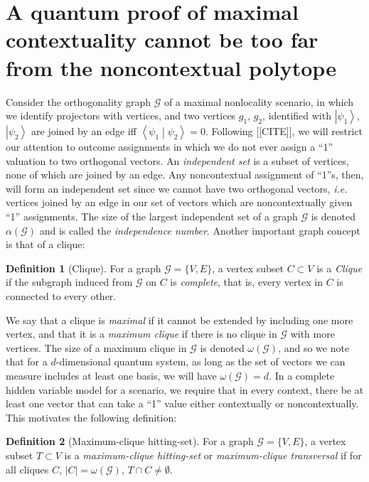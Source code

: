 \documentclass{amsart}
\theoremstyle{definition}
\newtheorem{defn}{Definition}
\newcommand{\ket}[1]{{\left\vert{#1}\right\rangle}}
\newcommand{\braket}[2]{{\left< {#1} \middle\vert {#2}\right>}}
\begin{document}
\section{A quantum proof of maximal contextuality cannot be too far from the noncontextual polytope}

Consider the orthogonality graph $\mathcal{G}$ of a maximal nonlocality scenario, in which we identify projectors with vertices, and two vertices $g_1$, $g_2$, identified with $\ket{\psi_1}$, $\ket{\psi_2}$ are joined by an edge iff $\braket{\psi_1}{\psi_2}=0$. Following [[CITE]], we will restrict our attention to outcome assignments in which we do not ever assign a ``1'' valuation to two orthogonal vectors. An \emph{independent set} is a subset of vertices, none of which are joined by an edge. Any noncontextual assignment of ``1''s, then, will form an independent set since we cannot have two orthogonal vectors, \emph{i.e.} vertices joined by an edge in our set of vectors which are noncontextually given ``1'' assignments. The size of the largest independent set of a graph $\mathcal{G}$ is denoted $\alpha(\mathcal{G})$ and is called the \emph{independence number}. Another important graph concept is that of a clique:%

\begin{defn}[Clique]
For a graph $\mathcal{G}=\{V,E\}$, a vertex subset $C\subset V$ is a \emph{Clique} if the subgraph induced from $\mathcal{G}$ on $C$ is \emph{complete}, that is,  every vertex in $C$ is connected to every other.
\end{defn}

We say that a clique is \emph{maximal} if it cannot be extended by including one more vertex, and that it is a \emph{maximum clique} if there is no clique in $\mathcal{G}$ with more vertices. The size of a maximum clique in $\mathcal{G}$ is denoted $\omega(\mathcal{G})$, and so we note that for a $d$-dimensional quantum system, as long as the set of vectors we can measure includes at least one basis, we will have $\omega(\mathcal{G})=d$. In a complete hidden variable model for a scenario, we require that in every context, there be at least one vector that can take a ``1'' value either contextually or noncontextually. This motivates the following definition:



\begin{defn}[Maximum-clique hitting-set]
For a graph $\mathcal{G}=\{V,E\}$, a vertex subset $T\subset V$ is a \emph{maximum-clique hitting-set} or \emph{maximum-clique transversal} if for all cliques $C$, $|C|=\omega(\mathcal{G})$, $T\cap C\neq\emptyset$.
\end{defn}
\end{document}
